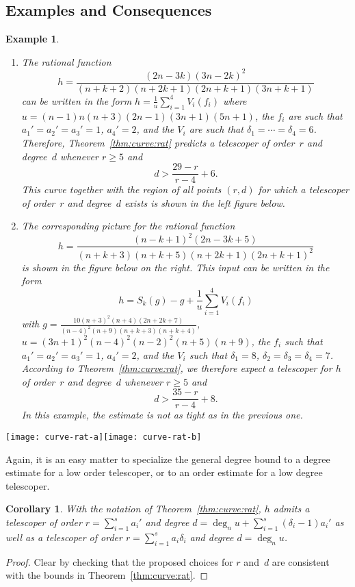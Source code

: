 \documentclass{sig-alternate}
\newtheorem{corollary}[theorem]{Corollary}
\newtheorem{example}[theorem]{Example}
\def\deg{\operatorname{deg}}
\begin{document}
\subsection{Examples and Consequences}

\begin{example}\label{ex:rat}
  \begin{enumerate}
  \item The rational function
    \[
      h = \frac{(2n-3k)(3n-2k)^2}{(n+k+2)(n+2k+1)(2n+k+1)(3n+k+1)}
    \]
    can be written in the form $h=\frac1 u\sum_{i=1}^4 V_i(f_i)$ where
    $u=(n-1)n(n+3)(2n-1)(3n+1)(5n+1)$,
    the $f_i$ are such that $a_1'=a_2'=a_3'=1$, $a_4'=2$, and
    the $V_i$ are such that $\delta_1=\cdots=\delta_4=6$.
    Therefore, Theorem~\ref{thm:curve:rat} predicts a telescoper of order~$r$ and degree~$d$
    whenever $r\geq5$ and
    \[
      d > \frac{29-r}{r-4} + 6.
    \]
    This curve together with the region of all points $(r,d)$ for which 
    a telescoper of order~$r$ and degree~$d$ exists is shown in the left figure below.
  \item The corresponding picture for the rational function
    \[
      h = \frac{(n-k+1)^2(2n-3k+5)}{(n+k+3)(n+k+5)(n+2k+1)(2n+k+1)^2}
    \]
    is shown in the figure below on the right. This input can be written in the form
    \[
      h = S_k(g) - g + \frac1u\sum_{i=1}^4 V_i(f_i)
    \]
    with $g=\frac{10(n+3)^2(n+4)(2n+2k+7)}{(n-4)^2(n+9)(n+k+3)(n+k+4)}$,
    $u=(3n+1)^2(n-4)^2(n-2)^2(n+5)(n+9)$,
    the $f_i$ such that $a_1'=a_2'=a_3'=1$, $a_4'=2$, and
    the $V_i$ such that $\delta_1=8$, $\delta_2=\delta_3=\delta_4=7$.
    According to Theorem~\ref{thm:curve:rat}, we therefore expect a telescoper for $h$
    of order~$r$ and degree~$d$ whenever $r\geq5$ and
    \[
      d > \frac{35-r}{r-4} + 8.
    \]
    In this example, the estimate is not as tight as in the previous one.
  \end{enumerate}
\end{example}



\centerline{\texttt{[image: curve-rat-a]}\hfil\texttt{[image: curve-rat-b]}}

\smallskip

Again, it is an easy matter to specialize the general degree bound to a degree estimate
for a low order telescoper, or to an order estimate for a low degree telescoper.

\begin{corollary}
  With the notation of Theorem~\ref{thm:curve:rat}, $h$ admits a telescoper of
  order $r=\sum_{i=1}^s a_i'$ and degree $d=\deg_n u + \sum_{i=1}^s (\delta_i-1)a_i'$
  as well as a telescoper of order $r=\sum_{i=1}^s a_i\delta_i$ and degree $d=\deg_nu$.
\end{corollary}
\begin{proof}
  Clear by checking that the proposed choices for $r$ and~$d$ are consistent with
  the bounds in Theorem~\ref{thm:curve:rat}.
\end{proof}
\end{document}
